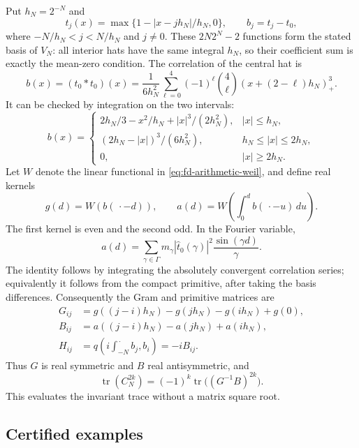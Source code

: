 Put \(h_N=2^{-N}\) and
\[
 t_j(x)=\max\{1-|x-jh_N|/h_N,0\},\qquad
 b_j=t_j-t_0,
\]
where \(-N/h_N<j<N/h_N\) and \(j\ne0\).
These \(2N2^N-2\) functions form the stated basis of \(V_N\):
all interior hats have the same integral \(h_N\), so their
coefficient sum is exactly the mean-zero condition.
The correlation of the central hat is
\[
 b(x)=(t_0*t_0)(x)
 =\frac1{6h_N^2}\sum_{\ell=0}^4
       (-1)^\ell\binom4\ell
             (x+(2-\ell)h_N)_+^3.
\]
It can be checked by integration on the two intervals:
\[
 b(x)=
 \begin{cases}
 2h_N/3-x^2/h_N+|x|^3/(2h_N^2),&|x|\le h_N,\\
 (2h_N-|x|)^3/(6h_N^2),&h_N\le|x|\le2h_N,\\
 0,&|x|\ge2h_N .
 \end{cases}
\]
Let \(W\) denote the linear functional in
\eqref{eq:fd-arithmetic-weil}, and define real kernels
\[
 g(d)=W(b(\,\cdot-d)),\qquad
 a(d)=W\left(\int_0^d b(\,\cdot-u)\,du\right).
\]
The first kernel is even and the second odd. In the Fourier
variable,
\[
 a(d)=\sum_{\gamma\in\Gamma}
      m_\gamma|\widehat t_0(\gamma)|^2
                   \frac{\sin(\gamma d)}{\gamma}.
\]
The identity follows by integrating the absolutely convergent
correlation series; equivalently it follows from the compact
primitive, after taking the basis differences.
Consequently the Gram and primitive matrices are
\[
 \begin{split}
 G_{ij}&=g((j-i)h_N)-g(jh_N)-g(ih_N)+g(0),\\
 B_{ij}&=a((j-i)h_N)-a(jh_N)+a(ih_N),\\
 H_{ij}&=q\left(i\int_{-N}^{\,\cdot}b_j,b_i\right)=-iB_{ij}.
 \end{split}
\]
Thus \(G\) is real symmetric and \(B\) real antisymmetric, and
\[
 \operatorname{tr}(C_N^{2k})
       =(-1)^k\operatorname{tr}\bigl((G^{-1}B)^{2k}\bigr).
 \label{eq:fd-arithmetic-trace}
\]
This evaluates the invariant trace without a matrix square root.

\subsection{Certified examples}

